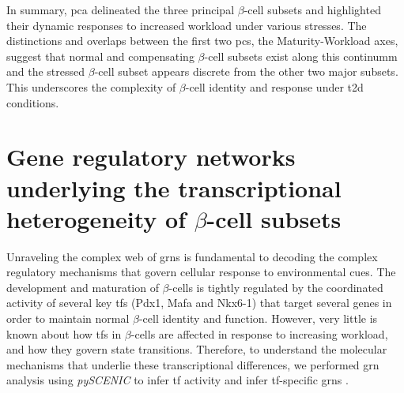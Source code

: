 \par In summary, \gls{pca} delineated the three principal $\beta$-cell subsets and highlighted their dynamic responses to increased workload under various stresses. The distinctions and overlaps between the first two \glspl{pc}, the Maturity-Workload axes, suggest that normal and compensating $\beta$-cell subsets exist along this continumm and the stressed $\beta$-cell subset appears discrete from the other two major subsets. This underscores the complexity of $\beta$-cell identity and response under \gls{t2d} conditions.  

\clearpage

\section[\glsentryshort{grn}s underlying the transcriptional heterogeneity of $\beta$-cell subsets]{Gene regulatory networks underlying the transcriptional\\heterogeneity of $\beta$-cell subsets}
\label{sec:chp3_betaGRN}



Unraveling the complex web of \glspl{grn} is fundamental to decoding the complex regulatory mechanisms that govern cellular response to environmental cues. The development and maturation of $\beta$-cells is tightly regulated by the coordinated activity of several key \glspl{tf} (Pdx1, Mafa and Nkx6-1) that target several genes in order to maintain normal $\beta$-cell identity and function. However, very little is known about how \glspl{tf} in $\beta$-cells are affected in response to increasing workload, and how they govern state transitions. Therefore, to understand the molecular mechanisms that underlie these transcriptional differences, we performed \gls{grn} analysis using \textit{pySCENIC} to infer \gls{tf} activity and infer \gls{tf}-specific \glspl{grn} \textbf{\cite{kumar_inference_2021}}.\\



